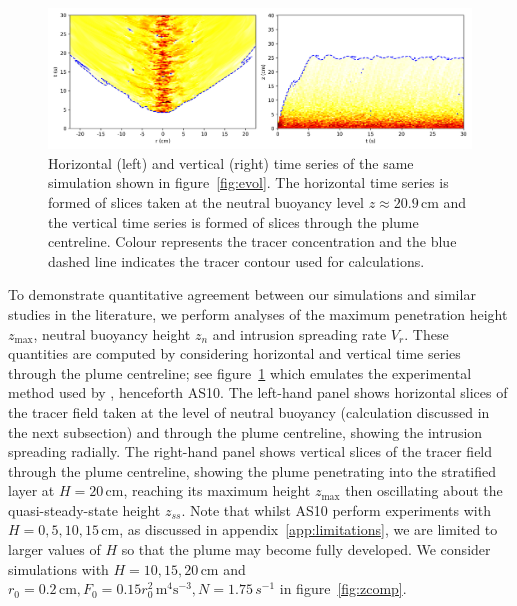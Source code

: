 \documentclass[a4paper]{article}
\begin{document}
\begin{figure}
	\centering
	\includegraphics[width=.9\textwidth]{timeseries}
	\caption{Horizontal (left) and vertical (right) time series of the same simulation shown in
		figure~\ref{fig:evol}. The horizontal time series is formed of slices taken at the neutral buoyancy
		level $z \approx 20.9 \, \mathrm{cm}$ and the vertical time series is formed of slices through the
		plume centreline. Colour represents the tracer concentration and the blue dashed line indicates the
		tracer contour used for calculations.}
	\label{fig:timeseries}
\end{figure}

To demonstrate quantitative agreement between our simulations and similar studies in the literature, we
perform analyses of the maximum penetration height $z_{\max}$, neutral buoyancy height $z_n$ and intrusion
spreading rate $V_r$. These quantities are computed by considering horizontal and vertical time series through
the plume centreline; see figure~\ref{fig:timeseries} which emulates the experimental method used by
\citet{ansong2010}, henceforth AS10. The left-hand panel shows horizontal slices of the tracer field taken
at the level of neutral buoyancy (calculation discussed in the next subsection) and through the plume
centreline, showing the intrusion spreading radially. The right-hand panel shows vertical slices of the
tracer field through the plume centreline, showing the plume penetrating into the stratified layer at $H=20 \,
\mathrm{cm}$, reaching its maximum height $z_{\max}$ then oscillating about the quasi-steady-state height
$z_{ss}$. Note that whilst AS10 perform experiments with $H = 0, 5, 10, 15 \, \mathrm{cm}$, as discussed in
appendix~\ref{app:limitations}, we are limited to larger values of $H$ so that the plume may become fully
developed. We consider simulations with $H = 10, 15, 20 \,\mathrm{cm}$ and $r_0 = 0.2 \, \mathrm{cm}, F_0 =
0.15r_0^2 \, \mathrm{m}^4 \mathrm{s}^{-3}, N = 1.75\,s^{-1}$ in figure~\ref{fig:zcomp}.
\end{document}
